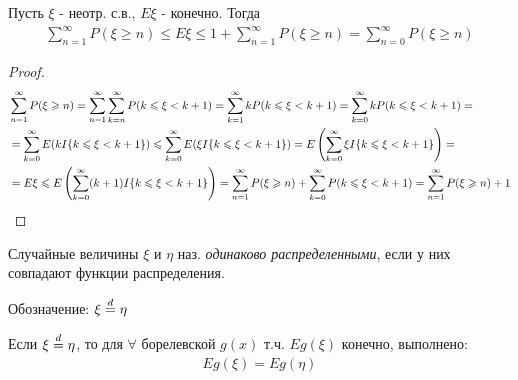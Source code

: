 
\begin{lemma}
  Пусть $\xi$ - неотр. с.в., $E\xi$ - конечно.
  Тогда
  \begin{align*}
    \sum_{n = 1}^{\infty} P(\xi \geq n) \leq E \xi \leq 1 + \sum_{n = 1}^{\infty} P(\xi \geq n) = 
    \sum_{n = 0}^{\infty} P(\xi \geq n)
  \end{align*}
\end{lemma}


\begin{proof}
  \begin{align*}
    &\sum_{n = 1}^{\infty} P(\xi \geqslant n)
    = \sum_{n = 1}^{\infty} \sum_{k = n}^{\infty} P(k \leqslant \xi < k + 1)
    = \sum_{k = 1}^{\infty} k P(k \leqslant \xi < k + 1) 
    = \sum_{k = 0}^{\infty} k P(k \leqslant \xi < k + 1) =\\
    &= \sum_{k = 0}^{\infty} E(k I \{ k \leqslant \xi < k + 1 \}) 
    \leqslant \sum_{k = 0}^{\infty} E(\xi I \{ k \leqslant \xi < k + 1 \})
    = E \left( \sum_{k = 0}^{\infty} \xi I \{ k \leqslant \xi < k + 1 \} \right) = \\
    &= E \xi \leqslant E\left( \sum_{k = 0}^{\infty} (k + 1) I \{ k \leqslant \xi < k + 1 \} \right)
    = \sum_{n = 1}^{\infty} P(\xi \geqslant n) + \sum_{k = 0}^{\infty} P(k \leqslant \xi < k + 1)  
    = \sum_{n = 1}^{\infty} P(\xi \geqslant n) + 1
  \end{align*}
\end{proof}

\begin{definition}
  Случайные величины $\xi$ и $\eta$ наз. \emph{одинаково распределенными}, 
  если у них совпадают функции распределения. 

  Обозначение: $\xi \stackrel{d}{=} \eta$
\end{definition}

\begin{statement}
  Если $\xi \stackrel{d}{=} \eta$, то для $\forall$ борелевской $g(x)$ т.ч. 
  $E g(\xi)$ конечно, выполнено:
  \begin{align*}
    E g(\xi) = E g(\eta)
  \end{align*}
\end{statement}


